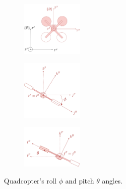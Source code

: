 \documentclass{ifacconf}
\begin{document}
\begin{figure}
    \centering
    \begin{subfigure}{0.31\columnwidth}
        \hspace{0.5cm}
        \includegraphics[trim={0.8cm 2cm 0cm 2cm}, clip, width=3cm]{images/drone_fromAbove2.png}
    \end{subfigure}
    \hfill
    \begin{subfigure}{0.31\columnwidth}
        \hspace{0.5cm}
        \includegraphics[trim={0cm 0cm 0.5cm 0cm}, clip, width=3cm]{images/drone_roll3.png}
    \end{subfigure}
    \hfill
    \begin{subfigure}{0.31\columnwidth}
        \hspace{0.3cm}
        \vspace{0.5cm}
        \includegraphics[trim={0.8cm 0.1cm 0cm 0.5cm}, clip, width=3cm]{images/drone_pitch2.png}
    \end{subfigure}
    \caption{Quadcopter's roll $\phi$ and pitch $\theta$ angles.} 
    \label{fig:drone_roll_pitch_frames}
\end{figure}
\end{document}

